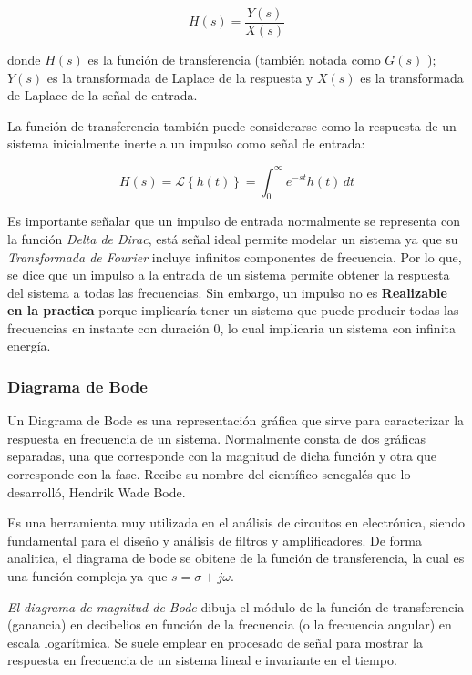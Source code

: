\documentclass{article}
\begin{document}
\begin{equation}
H (s) = \frac {Y(s)} {X(s)}
\end{equation}


donde $H (s)$ es la función de transferencia (también notada como
$G (s)$ ); $Y (s)$ es la transformada de Laplace de la respuesta y
$X (s)$ es la transformada de Laplace de la señal de entrada.

La función de transferencia también puede considerarse como la respuesta
de un sistema inicialmente inerte a un impulso como señal de entrada:


\begin{equation}
H(s) = \mathcal{L} \left \{ h(t) \right \} = \int_{0}^\infty e^{-st} h(t)\,dt 
\end{equation}


Es importante señalar que un impulso de entrada normalmente se
representa con la función \emph{Delta de Dirac}, está señal ideal
permite modelar un sistema ya que su \emph{Transformada de Fourier}
incluye infinitos componentes de frecuencia. Por lo que, se dice que un
impulso a la entrada de un sistema permite obtener la respuesta del
sistema a todas las frecuencias. Sin embargo, un impulso no es
\textbf{Realizable en la practica} porque implicaría tener un sistema
que puede producir todas las frecuencias en instante con duración 0, lo
cual implicaria un sistema con infinita energía.

\subsubsection{Diagrama de Bode}\label{diagrama-de-bode}

Un Diagrama de Bode es una representación gráfica que sirve para
caracterizar la respuesta en frecuencia de un sistema. Normalmente
consta de dos gráficas separadas, una que corresponde con la magnitud de
dicha función y otra que corresponde con la fase. Recibe su nombre del
científico senegalés que lo desarrolló, Hendrik Wade Bode.

Es una herramienta muy utilizada en el análisis de circuitos en
electrónica, siendo fundamental para el diseño y análisis de filtros y
amplificadores. De forma analitica, el diagrama de bode se obitene de la
función de transferencia, la cual es una función compleja ya que
$s=\sigma+j\omega$.

\emph{El diagrama de magnitud de Bode} dibuja el módulo de la función de
transferencia (ganancia) en decibelios en función de la frecuencia (o la
frecuencia angular) en escala logarítmica. Se suele emplear en procesado
de señal para mostrar la respuesta en frecuencia de un sistema lineal e
invariante en el tiempo.
\end{document}
